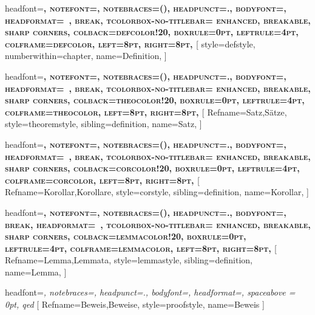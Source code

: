 {
  headfont=\normalfont\scshape\bfseries,
  notefont=\normalfont\bfseries,
  notebraces={(}{)},  %
  headpunct={.},
  bodyfont=\normalfont,
  headformat=\NAME~\NUMBER\NOTE,
  break,
  tcolorbox-no-titlebar={
    enhanced,
    breakable,
    sharp corners,
    colback=defcolor!20,
    boxrule=0pt,
    leftrule=4pt,       
    colframe=defcolor,
    left=8pt,
    right=8pt,
  }
}
[
style=defstyle,
numberwithin=chapter,
name=Definition,
]

{
  headfont=\normalfont\scshape\bfseries,
  notefont=\normalfont\bfseries,
  notebraces={(}{)},  %
  headpunct={.},
  bodyfont=\normalfont,
  headformat=\NAME~\NUMBER\NOTE,
  break,
  tcolorbox-no-titlebar={
    enhanced,
    breakable,
    sharp corners,
    colback=theocolor!20,
    boxrule=0pt,
    leftrule=4pt,       
    colframe=theocolor,
    left=8pt,
    right=8pt,
  }
}
[
Refname={Satz,Sätze},
style=theoremstyle,
sibling=definition,
name=Satz,
]

{
  headfont=\normalfont\scshape\bfseries,
  notefont=\normalfont\bfseries,
  notebraces={(}{)},  %
  headpunct={.},
  bodyfont=\normalfont,
  headformat=\NAME~\NUMBER\NOTE,
  break,
  tcolorbox-no-titlebar={
    enhanced,
    breakable,
    sharp corners,
    colback=corcolor!20,
    boxrule=0pt,
    leftrule=4pt,       
    colframe=corcolor,
    left=8pt,
    right=8pt,
  }
}
[
Refname={Korollar,Korollare},
style=corstyle,
sibling=definition,
name=Korollar,
]

{
  headfont=\normalfont\scshape\bfseries,
  notefont=\normalfont\bfseries,
  notebraces={(}{)},  %
  headpunct={.},
  bodyfont=\normalfont,
  break,
  headformat=\NAME~\NUMBER\NOTE,
  tcolorbox-no-titlebar={
    enhanced,
    breakable,
    sharp corners,
    colback=lemmacolor!20,
    boxrule=0pt,
    leftrule=4pt,       
    colframe=lemmacolor,
    left=8pt,
    right=8pt,
  }
}
[
Refname={Lemma,Lemmata},
style=lemmastyle,
sibling=definition,
name=Lemma,
]

{
headfont=\normalfont\itshape,
notebraces={}{},
headpunct={.},
bodyfont=\normalfont,
headformat=\NAME\NOTE,
spaceabove = 0pt,
qed
}
[
Refname={Beweis,Beweise},
style=proofstyle,
name=Beweis
]


